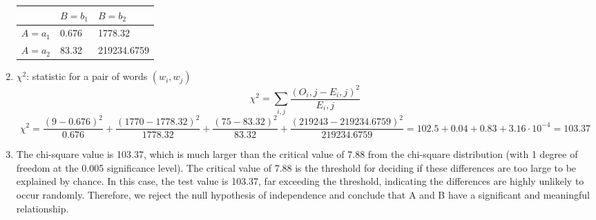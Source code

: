 \documentclass{article}
\begin{document}
\begin{enumerate}
\renewcommand{\arraystretch}{1}
	\begin{center}
	\begin{tabular} { | m{2cm} | m{2cm} | m{2cm} |  }
		\hline
		 & $B = b_1$ & $B = b_2$ \\
		\hline
		$A = a_1$ & 0.676 & 1778.32 \\
		\hline
		$A = a_2$ & 83.32 & 219234.6759 \\
		\hline
	\end{tabular}
	\end{center}
	\item $\chi^2$: statistic for a pair of words $(w_i, w_j)$
	\begin{equation*}
		\chi^2 = \sum_{i,j} \frac{(O_i,j - E_i,j)^2}{E_i,j}
	\end{equation*}
	\begin{equation*}
	\chi^2 = \frac{(9-0.676)^2}{0.676} + \frac{(1770-1778.32)^2}{1778.32} + \frac{(75-83.32)^2}{83.32} + \frac{(219243-219234.6759)^2}{219234.6759} = 102.5 + 0.04 + 0.83 + 3.16 \cdot 10^{-4} = 103.37
	\end{equation*}

	\item The chi-square value is 103.37, which is much larger than the critical value of 7.88 from the chi-square distribution (with 1 degree of freedom at the 0.005 significance level). The critical value of 7.88 is the threshold for deciding if these differences are too large to be explained by chance. In this case, the test value is 103.37, far exceeding the threshold, indicating the differences are highly unlikely to occur randomly. Therefore, we reject the null hypothesis of independence and conclude that A and B have a significant and meaningful relationship.

	\end{enumerate}
\end{document}
